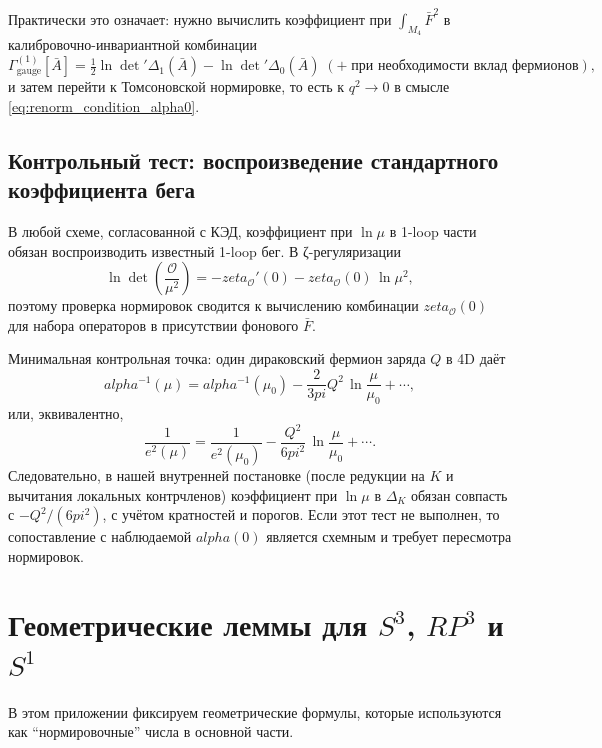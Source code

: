 \documentclass[12pt]{article}
\def\mathbb#1{#1}%
\def\alpha{alpha}%
\def\pi{pi}%
\def\zeta{zeta}%
\begin{document}
Практически это означает: нужно вычислить коэффициент при $\int_{M_4}\bar F^2$ в калибровочно-инвариантной комбинации
\begin{equation}
  \Gamma^{(1)}_{\mathrm{gauge}}[\bar A]
  =
  \tfrac12\ln\det'\Delta_1(\bar A)
  -\ln\det'\Delta_0(\bar A)
  \;(+\;\text{при необходимости вклад фермионов}),
\end{equation}
и затем перейти к Томсоновской нормировке, то есть к $q^2\to 0$ в смысле \eqref{eq:renorm_condition_alpha0}.

\subsection{Контрольный тест: воспроизведение стандартного коэффициента бега}
В любой схеме, согласованной с КЭД, коэффициент при $\ln\mu$ в 1-loop части обязан воспроизводить известный 1-loop бег.
В ζ-регуляризации
\begin{equation}
  \ln\det\!\left(\frac{\mathcal{O}}{\mu^2}\right)= -\zeta_{\mathcal{O}}'(0)-\zeta_{\mathcal{O}}(0)\,\ln \mu^2,
\end{equation}
поэтому проверка нормировок сводится к вычислению комбинации $\zeta_{\mathcal{O}}(0)$ для набора операторов в присутствии фонового $\bar F$.

Минимальная контрольная точка: один дираковский фермион заряда $Q$ в 4D даёт
\begin{equation}
  \alpha^{-1}(\mu)=\alpha^{-1}(\mu_0)-\frac{2}{3\pi}Q^2\,\ln\frac{\mu}{\mu_0}+\cdots,
\end{equation}
или, эквивалентно,
\begin{equation}
  \frac{1}{e^2(\mu)}=\frac{1}{e^2(\mu_0)}-\frac{Q^2}{6\pi^2}\,\ln\frac{\mu}{\mu_0}+\cdots.
\end{equation}
Следовательно, в нашей внутренней постановке (после редукции на $K$ и вычитания локальных контрчленов) коэффициент при $\ln\mu$ в $\Delta_K$ обязан совпасть с $-Q^2/(6\pi^2)$, с учётом кратностей и порогов.
Если этот тест не выполнен, то сопоставление с наблюдаемой \texorpdfstring{$\alpha(0)$}{alpha(0)} является схемным и требует пересмотра нормировок.

\section{Геометрические леммы для $S^3$, $\mathbb{RP}^3$ и $S^1$}
В этом приложении фиксируем геометрические формулы, которые используются как ``нормировочные'' числа в основной части.
\end{document}
